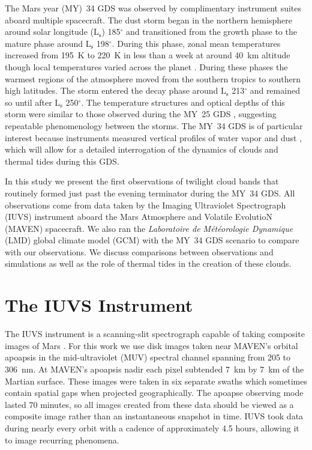 \documentclass[draft]{agujournal2019}
\begin{document}
The Mars year (MY)~34 GDS was observed by complimentary instrument suites aboard multiple spacecraft. The dust storm began in the northern hemisphere around solar longitude ($\mathrm{L_s}$) 185$^\circ$ \cite{Sanchez_this_issue} and transitioned from the growth phase to the mature phase around $\mathrm{L_s}$ 198$^\circ$. During this phase, zonal mean temperatures increased from 195~K to 220~K in less than a week at around 40~km altitude though local temperatures varied across the planet \cite{Guzewich_this_issue, Kass_this_issue}. During these phases the warmest regions of the atmosphere moved from the southern tropics to southern high latitudes. The storm entered the decay phase around $\mathrm{L_s}$ 213$^\circ$ and remained so until after $\mathrm{L_s}$ 250$^\circ$. The temperature structures and optical depths of this storm were similar to those observed during the MY~25 GDS \cite{Kass_this_issue}, suggesting repeatable phenomenology between the storms. The MY~34 GDS is of particular interest because instruments measured vertical profiles of water vapor \cite{Aoki_this_issue} and dust \cite{Klein_this_issue}, which will allow for a detailed interrogation of the dynamics of clouds and thermal tides during this GDS.

In this study we present the first observations of twilight cloud bands that routinely formed just past the evening terminator during the MY~34 GDS. All observations come from data taken by the Imaging Ultraviolet Spectrograph (IUVS) instrument aboard the Mars Atmosphere and Volatile EvolutioN (MAVEN) spacecraft. We also ran the \textit{Laboratoire de M\'et\'eorologie Dynamique} (LMD) global climate model (GCM) with the MY~34 GDS scenario to compare with our observations. We discuss comparisons between observations and simulations as well as the role of thermal tides in the creation of these clouds.

\section{The IUVS Instrument}
The IUVS instrument is a scanning-slit spectrograph capable of taking composite images of Mars \cite{McClintock15, Schneider18}. For this work we use disk images taken near MAVEN's orbital apoapsis in the mid-ultraviolet (MUV) spectral channel spanning from 205 to 306~nm. At MAVEN's apoapsis nadir each pixel subtended 7~km by 7~km of the Martian surface. These images were taken in six separate swaths which sometimes contain spatial gaps when projected geographically. The apoapse observing mode lasted 70 minutes, so all images created from these data should be viewed as a composite image rather than an instantaneous snapshot in time. IUVS took data during nearly every orbit with a cadence of approximately 4.5 hours, allowing it to image recurring phenomena.
\end{document}
